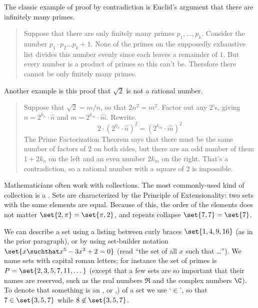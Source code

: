 The classic example of proof by contradiction is Euclid's
argument that there are infinitely many primes.
\begin{quote}\small
Suppose that there are only finitely many primes \( p_1,\dots,p_k \).
Consider the number \( p_1\cdot p_2\dots p_k +1 \).
None of the primes on the supposedly exhaustive list divides this number
evenly since each leaves a remainder of \( 1 \).
But every number is a product of primes so this can't be.
Therefore there cannot be only finitely many primes.
\end{quote}

Another example is this proof that
\( \sqrt{2} \) is not a rational number.
\begin{quote}\small
Suppose that  \( \sqrt{2}=m/n \), so that $2n^2=m^2$.
Factor out any \( 2 \)'s, giving
\( n=2^{k_n}\cdot \hat{n} \)
and
\( m=2^{k_m}\cdot \hat{m} \).
Rewrite.
\begin{equation*}
  2\cdot (2^{k_n}\cdot \hat{n})^2
  =
  (2^{k_m}\cdot \hat{m})^2
\end{equation*}
The Prime Factorization Theorem says that there must be the same number of
factors of \( 2 \) on both sides, but there are an odd number of them
\( 1+2k_n \) on the left and an even number \( 2k_m \) on the right.
That's a contradiction, so a rational number with a square of
\( 2 \) is impossible.
\end{quote}















Mathematicians often work with collections. 
The most commonly-used kind of collection is a . 
Sets are characterized by the Principle of Extensionality: 
two sets with the same elements are equal. 
Because of this, the order of the elements does not matter 
\( \set{2,\pi}=\set{\pi,2} \), 
and
repeats collapse \( \set{7,7}=\set{7} \).

We can describe a set using a listing between curly braces
\( \set{ 1,4,9,16 } \) (as in the prior paragraph), 
or by using set-builder notation
\( \set{x\suchthat x^5-3x^3+2=0 } \) (read ``the set of all \( x \)
such that \ldots'').
We name sets with capital roman letters; for instance the set of primes is
\( P=\set{2,3,5,7,11,\ldots\,} \) (except that a few sets 
are so important that their names are reserved, such as the
real numbers \( \Re \)
and the complex numbers \( \C \)).
To denote that something is an 
, 
or ,) of a set we
use `\(\in \)',
so that \( 7\in\set{3,5,7} \) while \( 8\not\in\set{3,5,7} \).

